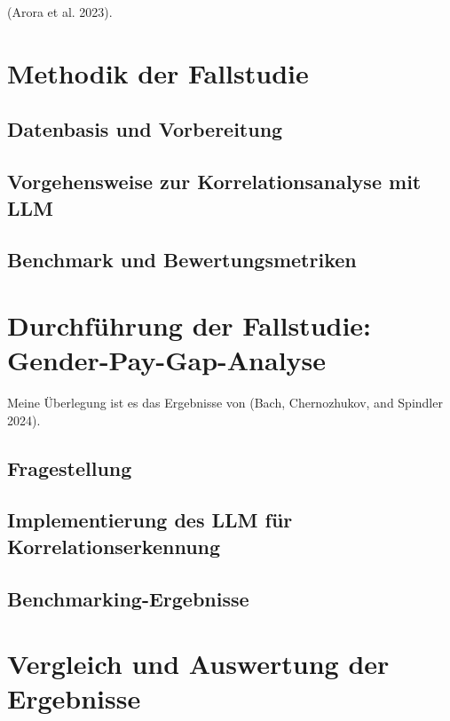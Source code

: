 \documentclass[
  11pt,
]{article}
\begin{document}
(Arora et al. 2023).

\section{Methodik der Fallstudie}\label{methodik-der-fallstudie}

\subsection{Datenbasis und
Vorbereitung}\label{datenbasis-und-vorbereitung}

\subsection{Vorgehensweise zur Korrelationsanalyse mit
LLM}\label{vorgehensweise-zur-korrelationsanalyse-mit-llm}

\subsection{Benchmark und
Bewertungsmetriken}\label{benchmark-und-bewertungsmetriken}

\section{Durchführung der Fallstudie:
Gender-Pay-Gap-Analyse}\label{durchfuxfchrung-der-fallstudie-gender-pay-gap-analyse}

Meine Überlegung ist es das Ergebnisse von (Bach, Chernozhukov, and
Spindler 2024).

\subsection{Fragestellung}\label{fragestellung}

\subsection{Implementierung des LLM für
Korrelationserkennung}\label{implementierung-des-llm-fuxfcr-korrelationserkennung}

\subsection{Benchmarking-Ergebnisse}\label{benchmarking-ergebnisse}

\section{Vergleich und Auswertung der
Ergebnisse}\label{vergleich-und-auswertung-der-ergebnisse}
\end{document}
